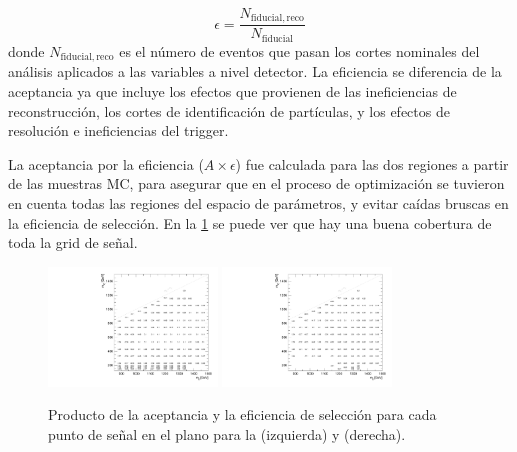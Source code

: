 \begin{equation}
  \epsilon = \frac{N_\mathrm{fiducial,reco}}{N_\mathrm{fiducial}}
\end{equation}
%
donde $N_\mathrm{fiducial,reco}$ es el número de eventos que pasan los cortes
nominales del análisis aplicados a las variables a nivel detector. La
eficiencia se diferencia de la aceptancia ya que incluye los efectos que provienen de
las ineficiencias de reconstrucción, los cortes de identificación de
partículas, y los efectos de resolución e ineficiencias del trigger.

La aceptancia por la eficiencia ($A\times\epsilon$) fue calculada para las dos
regiones a partir de las muestras MC, para asegurar que en el proceso de
optimización se tuvieron en cuenta todas las regiones del espacio de parámetros,
y evitar caídas bruscas en la eficiencia de selección. En la
\cref{fig:atimeseff} se puede ver que hay una buena cobertura de toda la grid
de señal.

\begin{figure}[!htb]
  \centering
  \includegraphics[width=0.4\textwidth]{figures/acceptance_srl}
  \hspace{1cm}%
  \includegraphics[width=0.4\textwidth]{figures/acceptance_srh}
  \caption{Producto de la aceptancia y la eficiencia de selección para cada punto de señal
    en el plano {\mgmn} para la {\SRL} (izquierda) y {\SRH} (derecha).}
  \label{fig:atimeseff}
\end{figure}









